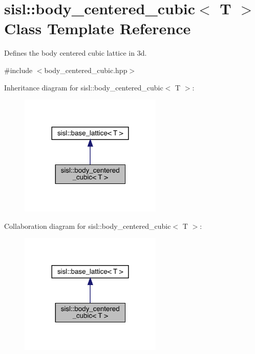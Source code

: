 \hypertarget{classsisl_1_1body__centered__cubic}{}\section{sisl\+:\+:body\+\_\+centered\+\_\+cubic$<$ T $>$ Class Template Reference}
\label{classsisl_1_1body__centered__cubic}


Defines the body centered cubic lattice in 3d.  




{\ttfamily \#include $<$body\+\_\+centered\+\_\+cubic.\+hpp$>$}



Inheritance diagram for sisl\+:\+:body\+\_\+centered\+\_\+cubic$<$ T $>$\+:\nopagebreak
\begin{figure}[H]
\begin{center}
\leavevmode
\includegraphics[width=192pt]{classsisl_1_1body__centered__cubic__inherit__graph}
\end{center}
\end{figure}


Collaboration diagram for sisl\+:\+:body\+\_\+centered\+\_\+cubic$<$ T $>$\+:\nopagebreak
\begin{figure}[H]
\begin{center}
\leavevmode
\includegraphics[width=192pt]{classsisl_1_1body__centered__cubic__coll__graph}
\end{center}
\end{figure}

